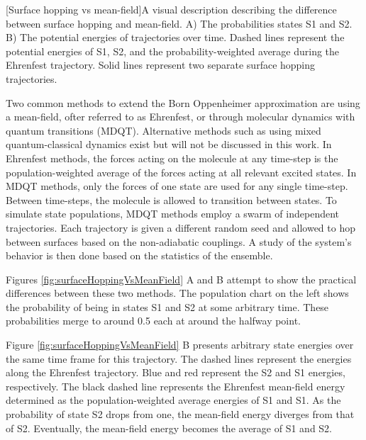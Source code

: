 \noindent
       \begin{multiFigure} 
	 [Surface hopping vs mean-field]{A visual description describing the difference between surface hopping and mean-field. A) The probabilities states S1 and S2. B) The potential energies of trajectories over time. Dashed lines represent the potential energies of S1, S2, and the probability-weighted average during the Ehrenfest trajectory. Solid lines represent two separate surface hopping trajectories.}
	 \label{fig:surfaceHoppingVsMeanField}
       \end{multiFigure}
\bigskip

Two common methods to extend the Born Oppenheimer approximation are using a mean-field, ofter referred to as Ehrenfest, or through molecular dynamics with quantum transitions (MDQT).\cite{Hammes-Schiffer1994} Alternative methods such as using mixed quantum-classical dynamics exist but will not be discussed in this work. \cite{habershon2013ring,kapral2006progress} In Ehrenfest methods, the forces acting on the molecule at any time-step is the population-weighted average of the forces acting at all relevant excited states. In MDQT methods, only the forces of one state are used for any single time-step. \cite{prezhdo1997evaluation}
Between time-steps, the molecule is allowed to transition between states.
To simulate state populations, MDQT methods employ a swarm of independent trajectories. Each trajectory is given a different random seed and allowed to hop between surfaces based on the non-adiabatic couplings. A study of the system's behavior is then done based on the statistics of the ensemble.

Figures \ref{fig:surfaceHoppingVsMeanField} A and B attempt to show the practical differences between these two methods.
The population chart on the left shows the probability of being in states S1 and S2 at some arbitrary time.
These probabilities merge to around 0.5 each at around the halfway point.

Figure \ref{fig:surfaceHoppingVsMeanField} B presents arbitrary state energies over the same time frame for this trajectory.
The dashed lines represent the energies along the Ehrenfest trajectory.
Blue and red represent the S2 and S1 energies, respectively.
The black dashed line represents the Ehrenfest mean-field energy determined as the population-weighted average energies of S1 and S1.
As the probability of state S2 drops from one, the mean-field energy diverges from that of S2.
Eventually, the mean-field energy becomes the average of S1 and S2.

